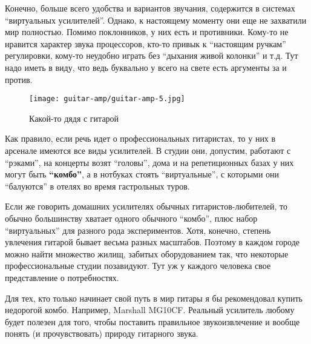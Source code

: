 Конечно, больше всего удобства и вариантов звучания, содержится в системах “виртуальных усилителей”. Однако, к настоящему моменту они еще не захватили мир полностью. Помимо поклонников, у них есть и противники. Кому-то не нравится характер звука процессоров, кто-то привык к “настоящим ручкам” регулировки, кому-то неудобно играть без “дыхания живой колонки” и т.д. Тут надо иметь в виду, что ведь буквально у всего на свете есть аргументы за и против.
\begin{figure}[h]
\begin{center}
\texttt{[image: guitar-amp/guitar-amp-5.jpg]}
\end{center}
\caption{Какой-то дядя с гитарой}
\label{guitar-amp:man-with-guitar}
\end{figure}

Как правило, если речь идет о профессиональных гитаристах, то у них в арсенале имеются все виды усилителей. В студии они, допустим, работают с “рэками”, на концерты возят “головы”, дома и на репетиционных базах у них могут быть \textbf{“комбо”}, а в нотбуках стоять “виртуальные”, с которыми они “балуются” в отелях во время гастрольных туров.

Если же говорить домашних усилителях обычных гитаристов-любителей, то обычно большинству хватает одного обычного “комбо”, плюс набор “виртуальных” для разного рода экспериментов. Хотя, конечно, степень увлечения гитарой бывает весьма разных масштабов. Поэтому в каждом городе можно найти множество жилищ, забитых оборудованием так, что некоторые профессиональные студии позавидуют. Тут уж у каждого человека свое представление о потребностях.

Для тех, кто только начинает свой путь в мир гитары я бы рекомендовал купить недорогой комбо. Например, Marshall MG10CF. Реальный усилитель любому будет полезен для того, чтобы поставить правильное звукоизвлечение и вообще понять (и прочувствовать) природу гитарного звука.